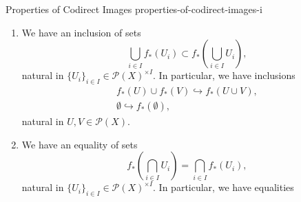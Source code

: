 \begin{proposition}{Properties of Codirect Images \rmI}{properties-of-codirect-images-i}
\begin{enumerate}
            \[
                \begin{tikzcd}[row sep={5.0*\the\DL,between origins}, column sep={11.5*\the\DL,between origins}, background color=backgroundColor, ampersand replacement=\&]
                    {\mathcal{P}(X)^{\op}\times\mathcal{P}(X)}
                    \arrow[r,"f^{\op}_{!}\times f_{*}"]
                    \arrow[d,"{[-_{1},-_{2}]_{X}}"']
                    \&
                    {\mathcal{P}(Y)^{\op}\times\mathcal{P}(Y)}
                    \arrow[d,"{[-_{1},-_{2}]_{Y}}"]
                    \\
                    {\mathcal{P}(X)}
                    \arrow[r,"f_{*}"']
                    \&
                    \mathcal{P}(Y)
                    \arrow[from=1-2,to=2-1,"\scalebox{1.5}{$\supset$}"{sloped,description},phantom,shorten <= 0.5*\the\DL,shorten >= 0.625*\the\DL,Rightarrow,pos=0.475]%
                \end{tikzcd}
            \]%
            with components
            \[
                [f_{!}(U),f_{*}(V)]_{Y}%
                \subset%
                f_{*}([U,V]_{X})%
            \]%
            indexed by $U,V\in\mathcal{P}(X)$.
        \item\label{properties-of-codirect-images-i-lax-preservation-of-colimits}We have an inclusion of sets
            \[
                \bigcup_{i\in I}f_{*}(U_{i})%
                \subset%
                f_{*}\left(\bigcup_{i\in I}U_{i}\right),%
            \]%
            natural in $\{U_{i}\}_{i\in I}\in\mathcal{P}(X)^{\times I}$. In particular, we have inclusions%
            \[
                \begin{gathered}
                    f_{*}(U)\cup f_{*}(V) \hookrightarrow f_{*}(U\cup V),\\
                    \emptyset             \hookrightarrow f_{*}(\emptyset),
                \end{gathered}
            \]%
            natural in $U,V\in\mathcal{P}(X)$.
        \item\label{properties-of-codirect-images-i-preservation-of-limits}We have an equality of sets
            \[
                f_{*}\left(\bigcap_{i\in I}U_{i}\right)%
                =%
                \bigcap_{i\in I}f_{*}(U_{i}),%
            \]%
            natural in $\{U_{i}\}_{i\in I}\in\mathcal{P}(X)^{\times I}$. In particular, we have equalities%
            \[
                \begin{gathered}

\end{gathered}\]
\end{enumerate}
\end{proposition}
